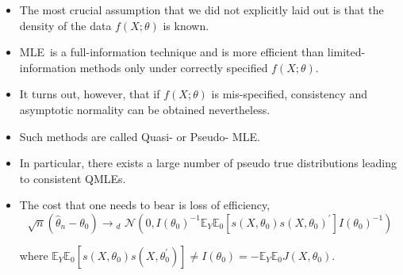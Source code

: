 \documentclass[notes=show]{beamer}
\begin{document}
\begin{frame}%


\begin{itemize}
\item The most crucial assumption that we did not explicitly laid out is
that the density of the data $f(X;\theta )$ is known.

\item MLE\ is a full-information technique and is more efficient than
limited-information methods only under correctly specified $f(X;\theta ).$

\item It turns out, however, that if $f(X;\theta )$ is mis-specified,
consistency and asymptotic normality can be obtained nevertheless.

\item Such methods are called Quasi- or Pseudo- MLE.

\item In particular, there exists a large number of pseudo true
distributions leading to consistent QMLEs.

\item The cost that one needs to bear is loss of efficiency,%
\begin{equation*}
\sqrt{n}\left( \hat{\theta}_{n}-\theta _{0}\right) \rightarrow \!_{d}\text{
\ }\mathcal{N}\left( 0,I(\theta _{0})^{-1}\mathbb{E}_{Y}\mathbb{E}%
_{0}[s(X,\theta _{0})s(X,\theta _{0})^{\prime }]I(\theta _{0})^{-1}\right)
\end{equation*}

where $\mathbb{E}_{Y}\mathbb{E}_{0}[s(X,\theta _{0})s(X,\theta _{0}^{\prime
})]\neq I(\theta _{0})=-\mathbb{E}_{Y}\mathbb{E}_{0}J(X,\theta _{0}).$
\end{itemize}

\end{frame}%
\end{document}
